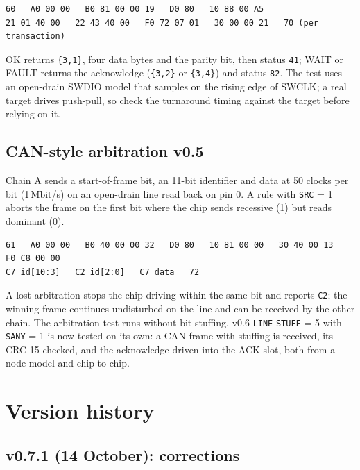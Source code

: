 \documentclass[11pt,a4paper]{article}
\newcommand{\vfive}{\textcolor{fivec}{\textsf{\small v0.5}}}
\newcommand{\vsix}{\textcolor{sixc}{\textsf{\small v0.6}}}
\newcommand{\sig}[1]{\texttt{#1}}
\begin{document}
\begin{lstlisting}
60   A0 00 00   B0 81 00 00 19   D0 80   10 88 00 A5
21 01 40 00   22 43 40 00   F0 72 07 01   30 00 00 21   70 (per transaction)
\end{lstlisting}

OK returns \texttt{\{3,1\}}, four data bytes and the parity bit, then status \texttt{41}; WAIT or FAULT returns the acknowledge (\texttt{\{3,2\}} or \texttt{\{3,4\}}) and status \texttt{82}. The test uses an open-drain SWDIO model that samples on the rising edge of SWCLK; a real target drives push-pull, so check the turnaround timing against the target before relying on it.

\subsection{CAN-style arbitration \vfive}

Chain A sends a start-of-frame bit, an 11-bit identifier and data at 50 clocks per bit (1\,Mbit/s) on an open-drain line read back on pin 0. A rule with \sig{SRC} = 1 aborts the frame on the first bit where the chip sends recessive (1) but reads dominant (0).

\begin{lstlisting}
61   A0 00 00   B0 40 00 00 32   D0 80   10 81 00 00   30 40 00 13   F0 C8 00 00
C7 id[10:3]   C2 id[2:0]   C7 data   72
\end{lstlisting}

A lost arbitration stops the chip driving within the same bit and reports \texttt{C2}; the winning frame continues undisturbed on the line and can be received by the other chain. The arbitration test runs without bit stuffing. \vsix{} \sig{LINE} \sig{STUFF} = 5 with \sig{SANY} = 1 is now tested on its own: a CAN frame with stuffing is received, its CRC-15 checked, and the acknowledge driven into the ACK slot, both from a node model and chip to chip.

\section{Version history}\label{sec:history}

\subsection{v0.7.1 (14 October): corrections}
\end{document}
